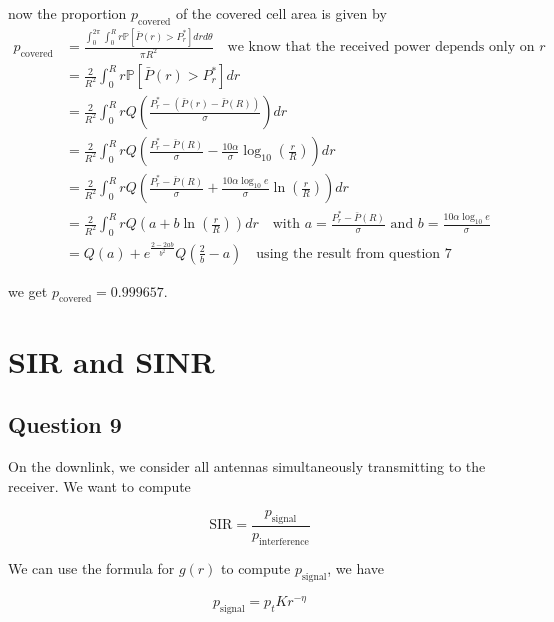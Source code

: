 \documentclass[]{article}
\begin{document}
	now the proportion $p_{\text{covered}}$ of the covered cell area is given by
	\begin{align}
		p_{\text{covered}} &= \frac{\int_{0}^{2\pi}\int_{0}^{R} r \mathbb{P} \left[\bar{P}(r) > P_r^* \right] dr d\theta}{\pi R^2} \quad \text{we know that the received power depends only on $r$} \\
		&= \frac{2}{R^2} \int_{0}^{R} r \mathbb{P}\left[ \bar{P}(r) > P_r^*\right] dr \\
		&= \frac{2}{R^2} \int_{0}^{R} r Q\left(\frac{P_r^* - (\bar{P}(r) - \bar{P}(R))}{\sigma}\right) dr \\
		&= \frac{2}{R^2} \int_{0}^{R} r Q\left(\frac{P_r^* - \bar{P}(R)}{\sigma} - \frac{10\alpha}{\sigma}\log_{10}\left(\frac{r}{R}\right)\right) dr \\
		&=\frac{2}{R^2} \int_{0}^{R} r Q\left(\frac{P_r^* - \bar{P}(R)}{\sigma} + \frac{10\alpha \log_{10} e}{\sigma}\ln\left(\frac{r}{R}\right)\right) dr \\
		&=\frac{2}{R^2} \int_{0}^{R} r Q\left(a + b\ln\left(\frac{r}{R}\right)\right) dr \quad \text{with }a=\frac{P_r^* - \bar{P}(R)}{\sigma} \text{ and } b = \frac{10\alpha \log_{10} e}{\sigma} \\
		&=  Q(a) + e^{\frac{2 - 2ab}{b^2}}Q\left(\frac{2}{b} - a\right) \quad \text{using the result from question 7}
	\end{align}
	
	we get $p_{\text{covered}} = 0.999657$.
	
	\section{SIR and SINR}
	
	\subsection*{Question 9}
	
	On the downlink, we consider all antennas simultaneously transmitting to the receiver. We want to compute
	
	\begin{equation}
		\mathrm{SIR} = \frac{p_{\text{signal}}}{p_{\text{interference}}}
	\end{equation}
	
	We can use the formula for $g(r)$ to compute $p_{\text{signal}}$, we have
	
	\begin{equation}
		p_{\text{signal}} = p_tKr^{-\eta}
	\end{equation}
	
\end{document}
